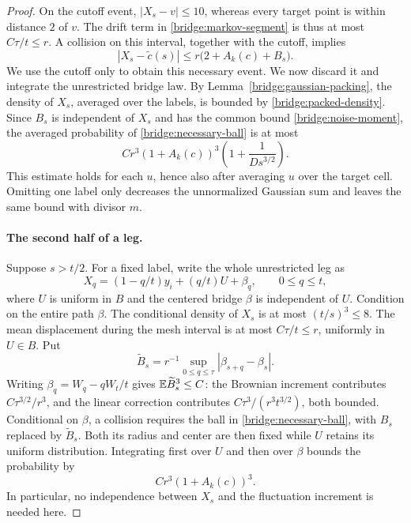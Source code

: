 \begin{proof}
On the cutoff event, $|X_s-v|\le10$, whereas every target point is within
distance $2$ of $v$.  The drift term in
\eqref{bridge:markov-segment} is thus at most $C\tau/t\le r$.
A collision on this interval, together with the cutoff, implies
\begin{equation}\label{bridge:necessary-ball}
 |X_s-\widetilde c(s)|
 \le r\bigl(2+A_k(c)+B_s\bigr).
\end{equation}
We use the cutoff only to obtain this necessary event.  We now discard
it and integrate the unrestricted bridge law.  By
Lemma~\ref{bridge:gaussian-packing}, the density of $X_s$, averaged over
the labels, is bounded by \eqref{bridge:packed-density}.  Since $B_s$
is independent of $X_s$ and has the common bound
\eqref{bridge:noise-moment}, the averaged probability of
\eqref{bridge:necessary-ball} is at most
\begin{equation}\label{bridge:early-step}
 Cr^3(1+A_k(c))^3
 \left(1+\frac{1}{Ds^{3/2}}\right).
\end{equation}
This estimate holds for each $u$, hence also after averaging $u$ over
the target cell.  Omitting one label only decreases the unnormalized
Gaussian sum and leaves the same bound with divisor $m$.

\paragraph{The second half of a leg.}
Suppose $s>t/2$.  For a fixed label, write the whole unrestricted leg as
\[
 X_q=(1-q/t)y_i+(q/t)U+\beta_q,\qquad 0\le q\le t,
\]
where $U$ is uniform in $B$ and the centered bridge $\beta$ is
independent of $U$.  Condition on the entire path $\beta$.  The
conditional density of $X_s$ is at most $(t/s)^3\le8$.
The mean displacement during the mesh interval is at most
$C\tau/t\le r$, uniformly in $U\in B$.  Put
\[
 \widetilde B_s=
 r^{-1}\sup_{0\le q\le\tau}|\beta_{s+q}-\beta_s|.
\]
Writing $\beta_q=W_q-qW_t/t$ gives
$\mathbb E\widetilde B_s^3\le C$: the Brownian increment contributes
$C\tau^{3/2}/r^3$, and the linear correction contributes
$C\tau^3/(r^3t^{3/2})$, both bounded.  Conditional on $\beta$, a
collision requires the ball in \eqref{bridge:necessary-ball}, with
$B_s$ replaced by $\widetilde B_s$.  Both its radius and center are then
fixed while $U$ retains its uniform distribution.  Integrating first
over $U$ and then over $\beta$ bounds the probability by
\begin{equation}\label{bridge:late-step}
 Cr^3(1+A_k(c))^3.
\end{equation}
In particular, no independence between $X_s$ and the fluctuation
increment is needed here.


\end{proof}
